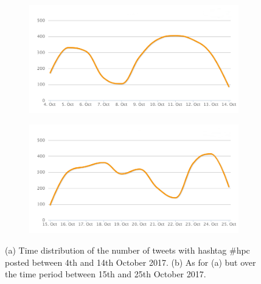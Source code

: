 \begin{figure}
 \centering
 \begin{subfigure}[b]{0.9\textwidth}
   \includegraphics[width=1\linewidth]{Images/FirstSearch_HPC.png}
   \caption{} 
 \end{subfigure}

 \begin{subfigure}[b]{0.9\textwidth}
   \includegraphics[width=1\linewidth]{Images/SecondSearch_HPC.png}
   \caption{}
 \end{subfigure}
 \caption{(a) Time distribution of the number of tweets with hashtag \#hpc posted between 4th and 14th October 2017. (b) As for (a) but over the time period between 15th and 25th October 2017.} 
 \label{First-SecondSearch_HPC}
\end{figure}


